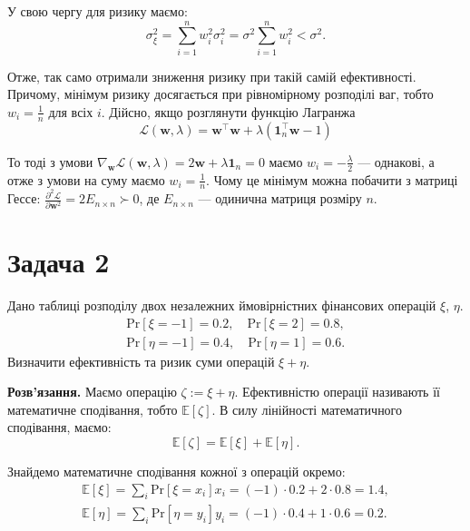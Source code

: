 \documentclass{test_template}
\begin{document}
У свою чергу для ризику маємо:
\begin{equation*}
    \sigma_{\xi}^2 = \sum_{i=1}^n w_i^2\sigma_i^2 = \sigma^2 \sum_{i=1}^n w_i^2 < \sigma^2.
\end{equation*}

Отже, так само отримали зниження ризику при такій самій ефективності. Причому,
мінімум ризику досягається при рівномірному розподілі ваг, тобто $w_i =
\frac{1}{n}$ для всіх $i$. Дійсно, якщо розглянути функцію Лагранжа
\begin{equation*}
    \mathcal{L}(\mathbf{w},\lambda)=\mathbf{w}^{\top}\mathbf{w} + \lambda(\mathbf{1}_n^{\top}\mathbf{w}-1)    
\end{equation*}

То тоді з умови $\nabla_{\mathbf{w}}\mathcal{L}(\mathbf{w},\lambda) =
2\mathbf{w} + \lambda\mathbf{1}_n = 0$ маємо $w_i=-\frac{\lambda}{2}$ ---
однакові, а отже з умови на суму маємо $w_i=\frac{1}{n}$. Чому це мінімум можна
побачити з матриці Гессе: $\frac{\partial^2\mathcal{L}}{\partial\mathbf{w}^2} =
2E_{n \times n} \succ 0$, де $E_{n \times n}$ --- одинична матриця розміру $n$.


\newpage

\section{Задача 2}

\begin{problem}
    Дано таблиці розподілу двох незалежних ймовірністних фінансових операцій $\xi$, $\eta$.
    \begin{gather*}
        \text{Pr}[\xi=-1] = 0.2, \quad \text{Pr}[\xi=2] = 0.8, \\
        \text{Pr}[\eta=-1] = 0.4, \quad \text{Pr}[\eta=1] = 0.6.
    \end{gather*}
    Визначити ефективність та ризик суми операцій $\xi + \eta$.
\end{problem}

\textbf{Розв'язання.} Маємо операцію $\zeta := \xi + \eta$. Ефективністю 
операції називають її математичне сподівання, тобто $\mathbb{E}[\zeta]$. 
В силу лінійності математичного сподівання, маємо:
\begin{equation*}
    \mathbb{E}[\zeta] = \mathbb{E}[\xi] + \mathbb{E}[\eta].
\end{equation*}

Знайдемо математичне сподівання кожної з операцій окремо:
\begin{gather*}
    \mathbb{E}[\xi] = \sum_{i} \text{Pr}[\xi=x_i]x_i = (-1) \cdot 0.2 + 2 \cdot 0.8 = 1.4, \\
    \mathbb{E}[\eta] = \sum_i \text{Pr}[\eta=y_i]y_i = (-1) \cdot 0.4 + 1 \cdot 0.6 = 0.2.
\end{gather*}
\end{document}
